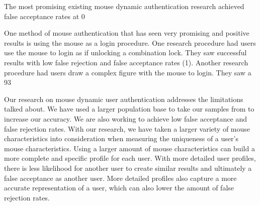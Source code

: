 \documentclass[conference]{IEEEtran}
\begin{document}
The most promising existing mouse dynamic authentication research achieved false acceptance rates at 0%

One method of mouse authentication that has seen very promising and positive results is using the mouse as a login procedure. One research procedure had users use the mouse to login as if unlocking a combination lock. They saw successful results with low false rejection and false acceptance rates (1). Another research procedure had users draw a complex figure with the mouse to login. They saw a 93%

Our research on mouse dynamic user authentication addresses the limitations talked about. We have used a larger population base to take our samples from to increase our accuracy. We are also working to achieve low false acceptance and false rejection rates. With our research, we have taken a larger variety of mouse characteristics into consideration when measuring the uniqueness of a user’s mouse characteristics. Using a larger amount of mouse characteristics can build a more complete and specific profile for each user. With more detailed user profiles, there is less likelihood for another user to create similar results and ultimately a false acceptance as another user. More detailed profiles also capture a more accurate representation of a user, which can also lower the amount of false rejection rates.
\end{document}
